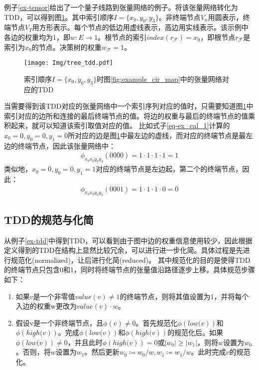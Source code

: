 \begin{example}
    \label{ex-tdd}
    例子\ref{ex-tensor}给出了一个量子线路到张量网络的例子。将该张量网络转化为TDD，可以得到图\ref{fig:tdd_ex}。其中索引顺序$I=\{x_0,y_0,y_3\}$。非终端节点$V_n$用圆表示，终端节点$V_T$用方形表示。每个节点的低边用虚线表示，高边用实线表示。该示例中各边的权重均为1，即$w:E\rightarrow 1$。根节点的索引$index(r_{\mathcal{F}})=x_0$，即根节点\(r_{\mathcal{F}}\)是索引为\(x_0\)的节点。决策树的权重$w_{\mathcal{F}}=1$。

\begin{figure}[!htbp]
    \centering
    \texttt{[image: Img/tree\_tdd.pdf]}
    \caption{索引顺序$I=\{x_0,y_0,y_3\}$时图\ref{fig:example_cir_map}中的张量网络对应的TDD}   
    \label{fig:tdd_ex}
\end{figure}
当需要得到该TDD对应的张量网络中一个索引序列对应的值时，只需要知道图\ref{fig:tdd_ex}中索引对应的边所和连接的最后终端节点的值。将边的权重与最后的终端节点的值乘积起来，就可以知道该索引取值对应的值。
比如式子\ref{eq-ex_cal_1}计算的\(x_0 = 0, y_0 = 0, y_1 = 0\)所对应的边是图\ref{fig:tdd_ex}中最左边的虚线，而对应的终端节点是最左边的终端节点，因此该张量网络中：
\begin{equation}
    \begin{aligned}
\phi_{x_0x_0y_0y_3}\left(0000\right)
    = 1\cdot 1\cdot 1\cdot 1 = 1
    \end{aligned}
\end{equation}
类似地，\(x_0 = 0, y_0 = 0, y_1 = 1\)对应的终端节点是左边起，第二个的终端节点，因此：
\begin{equation}
    \begin{aligned}
\phi_{x_0x_0y_0y_3}\left(0001\right)
= 1\cdot 1\cdot 1\cdot 0 = 0
    \end{aligned}
\end{equation}
\end{example}
\subsection{TDD的规范与化简}
\label{sec-reduce}
从例子\ref{ex-tdd}中得到TDD，可以看到由于图中边的权重信息使用较少，因此根据定义得到的TDD在结构上显然比较冗余，可以进行进一步化简。具体过程是先进行规范化(normalized)，让后进行化简(reduced)\citep{Hong_2022}。
其中规范化的目的是使得TDD的终端节点只包含0和1，同时将终端节点的张量值沿路径逐步上移。具体规范步骤如下：
\begin{enumerate}
    \item 如果$v$是一个非零值$value\left(v\right)\neq 1$的终端节点，则将其值设置为1，并将每个入边的权重w更改为$value\left(v\right)\cdot w$。\label{norm1}
    \item 假设v是一个非终端节点，且$\phi\left(v\right)\neq 0$。首先规范化$\phi\left.\left(low(v\right)\right)$和$\phi\left.\left(high(v\right)\right)$。完成$\phi\left.\left(low(v\right)\right)$和$\phi\left.\left(high(v\right)\right)$的规范化后。如果$\phi\left.\left(low(v\right)\right)\neq 0$，并且此时$\phi\left.\left(high(v\right)\right)=0$或$\left|w_0\right|\geq\left|w_1\right|$，则将$w$设置为$w_0$。否则，将$w$设置为$w_1$。然后更新$w_0≔w_0/w,w_1≔w_1/w$。此时完成$v$的规范化。\label{norm2}
\end{enumerate}



